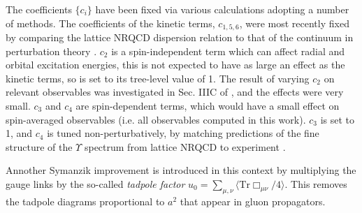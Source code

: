     The coefficients $\{c_i\}$ have been fixed via various calculations adopting a number of methods. The coefficients of the kinetic terms, $c_{1,5,6}$, were most recently fixed by comparing the lattice NRQCD dispersion relation to that of the continuum in perturbation theory \cite{Davies:2018fwg}. $c_2$ is a spin-independent term which can affect radial and orbital excitation energies, this is not expected to have as large an effect as the kinetic terms, so is set to its tree-level value of 1. The result of varying $c_2$ on relevant observables was investigated in Sec. IIIC of \cite{Dowdall:2011wh}, and the effects were very small. $c_3$ and $c_4$ are spin-dependent terms, which would have a small effect on spin-averaged observables (i.e. all observables computed in this work). $c_3$ is set to 1, and $c_4$ is tuned non-perturbatively, by matching predictions of the fine structure of the $\Upsilon$ spectrum from lattice NRQCD to experiment \cite{Dowdall:2011wh}.

Annother Symanzik improvement is introduced in this context by multiplying the gauge links by the so-called {\textit{tadpole factor}} $u_0 = \sum_{\mu,\nu}\langle \text{Tr}\Box_{\mu\nu} /4\rangle$. This removes the tadpole diagrams proportional to $a^2$ that appear in gluon propagators.
